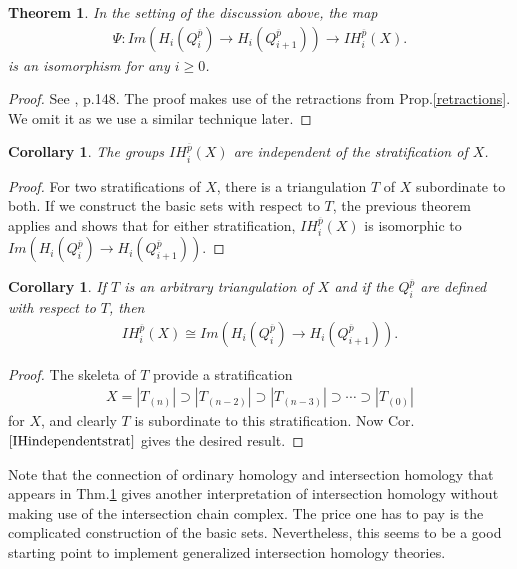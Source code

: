 \documentclass{scrreprt}
\newtheorem{theorem}[prop]{Theorem}
\newtheorem{corollar}[prop]{Corollary}
\begin{document}
\begin{theorem}\label{theorembasicsets}
In the setting of the discussion above, the map
\begin{align*}
\Psi: Im(H_i(Q_{i}^{\overline{p}}) \to H_i(Q_{i+1}^{\overline{p}})) \to IH_i^{\overline{p}}(X).
\end{align*}
is an isomorphism for any $i \geq 0$.
\end{theorem}

\begin{proof}
See \cite{GM}, p.148. The proof makes use of the retractions from Prop.\ref{retractions}. We omit it as we use a similar technique later.
\end{proof}

\begin{corollar}
The groups $IH_i^{\overline{p}}(X)$ are independent of the stratification of $X$.
\end{corollar}

\begin{proof}
For two stratifications of $X$, there is a triangulation $T$ of $X$ subordinate to both. If we construct the basic sets with respect to $T$, the previous theorem applies and shows that for either stratification, $IH_i^{\overline{p}}(X)$ is isomorphic to $Im(H_i(Q_{i}^{\overline{p}}) \to H_i(Q_{i+1}^{\overline{p}}))$.
\end{proof}

\begin{corollar}\label{IHindependentstrat}
If $T$ is an arbitrary triangulation of $X$ and if the $Q_i^{\overline{p}}$ are defined with respect to $T$, then
\begin{align*}
IH_i^{\overline{p}}(X) \cong Im(H_i(Q_{i}^{\overline{p}}) \to H_i(Q_{i+1}^{\overline{p}})).
\end{align*}
\end{corollar}

\begin{proof}
The skeleta of $T$ provide a stratification
\begin{align*}
X= |T_{(n)}| \supset |T_{(n-2)}| \supset |T_{(n-3)}| \supset \cdots \supset |T_{(0)}|
\end{align*}
for $X$, and clearly $T$ is subordinate to this stratification. Now Cor.$\ref{IHindependentstrat}$ gives the desired result.
\end{proof}

Note that the connection of ordinary homology and intersection homology that appears in Thm.\ref{theorembasicsets} gives another interpretation of intersection homology without making use of the intersection chain complex. The price one has to pay is the complicated construction of the basic sets. Nevertheless, this seems to be a good starting point to implement generalized intersection homology theories.
\end{document}
